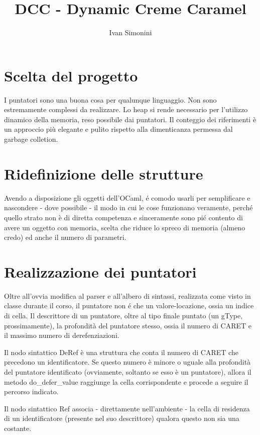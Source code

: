 \documentclass[a4paper, 12pt, bookmarks, openany]{article}
\begin{document}
\title{DCC - Dynamic Creme Caramel}
\author{Ivan Simonini}
\maketitle

\section{Scelta del progetto}
I puntatori sono una buona cosa per qualunque linguaggio. Non sono
estremamente complessi da realizzare. Lo heap si rende necessario per
l'utilizzo dinamico della memoria, reso possibile dai puntatori. Il
conteggio dei riferimenti \`e un approccio pi\`u elegante e pulito rispetto
alla dimenticanza permessa dal garbage colletion.

\section{Ridefinizione delle strutture}
Avendo a disposizione gli oggetti dell'OCaml, \'e comodo usarli per
semplificare e nascondere - dove possibile - il modo in cui le cose
funzionano veramente, perch\'e quello strato non \`e di diretta competenza e
sinceramente sono pi\'c contento di avere un oggetto con memoria, scelta che
riduce lo spreco di memoria (almeno credo) ed anche il numero di parametri.

\section{Realizzazione dei puntatori}
Oltre all'ovvia modifica al parser e all'albero di sintassi, realizzata come
visto in classe durante il corso, il puntatore non \'e che un
valore-locazione, ossia un indice di cella. Il descrittore di un puntatore,
oltre al tipo finale puntato (un gType, prossimamente), la profondit\`a del
puntatore stesso, ossia il numero di CARET e il massimo numero di
derefenziazioni.

Il nodo sintattico DeRef \`e una struttura che conta il numero di CARET che
precedono un identificatore. Se questo numero \`e minore o uguale alla
profondit\`a del puntatore identificato (ovviamente, soltanto se esso \`e un
puntatore), allora il metodo do\_defer\_value raggiunge la cella
corrispondente e procede a seguire il percorso indicato.

Il nodo sintattico Ref associa - direttamente nell'ambiente - la cella di
residenza di un identificatore (presente nel suo descrittore) qualora questo
non sia una costante.
\end{document}
